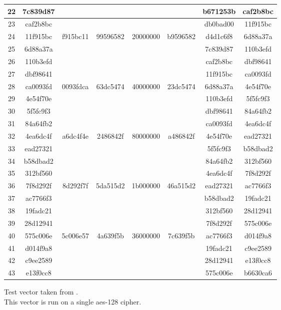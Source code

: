 \begin{small}
\begin{longtable}{| c | c | c | c | c | c | c | c |}
    22 & 7c839d87 & & & & & b671253b & caf2b8bc \\ \hline
    23 & caf2b8bc & & & & & db0bad00 & 11f915bc \\ \hline
    24 & 11f915bc & f915bc11 & 99596582 & 20000000
    & b9596582 & d4d1c6f8 & 6d88a37a \\ \hline
    25 & 6d88a37a & & & & & 7c839d87 & 110b3efd \\ \hline
    26 & 110b3efd & & & & & caf2b8bc & dbf98641 \\ \hline
    27 & dbf98641 & & & & & 11f915bc & ca0093fd \\ \hline
    28 & ca0093fd & 0093fdca & 63dc5474 & 40000000
    & 23dc5474 & 6d88a37a & 4e54f70e \\ \hline
    29 & 4e54f70e & & & & & 110b3efd & 5f5fc9f3 \\ \hline
    30 & 5f5fc9f3 & & & & & dbf98641 & 84a64fb2 \\ \hline
    31 & 84a64fb2 & & & & & ca0093fd & 4ea6dc4f \\ \hline
    32 & 4ea6dc4f & a6dc4f4e & 2486842f & 80000000
    & a486842f & 4e54f70e & ead27321 \\ \hline
    33 & ead27321 & & & & & 5f5fc9f3 & b58dbad2 \\ \hline
    34 & b58dbad2 & & & & & 84a64fb2 & 312bf560 \\ \hline
    35 & 312bf560 & & & & & 4ea6dc4f & 7f8d292f \\ \hline
    36 & 7f8d292f & 8d292f7f & 5da515d2 & 1b000000
    & 46a515d2 & ead27321 & ac7766f3 \\ \hline
    37 & ac7766f3 & & & & & b58dbad2 & 19fadc21 \\ \hline
    38 & 19fadc21 & & & & & 312bf560 & 28d12941 \\ \hline
    39 & 28d12941 & & & & & 7f8d292f & 575c006e \\ \hline
    40 & 575c006e & 5c006e57 & 4a639f5b & 36000000
    & 7c639f5b & ac7766f3 & d014f9a8 \\ \hline
    41 & d014f9a8 & & & & & 19fadc21 & c9ee2589 \\ \hline
    42 & c9ee2589 & & & & & 28d12941 & e13f0cc8 \\ \hline
    43 & e13f0cc8 & & & & & 575c006e & b6630ca6 \\ \hline
  \end{longtable}
\end{small}

Test vector taken from \citet[pp. 35--36]{AES:2001}. \\
This vector is run on a single aes-128 cipher.

